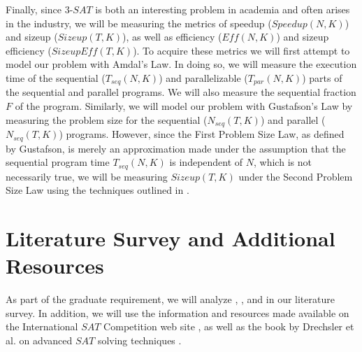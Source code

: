 \documentclass[paper=a4, fontsize=11pt]{scrartcl} %
\begin{document}
Finally, since $3$-$SAT$ is both an interesting problem in academia and often arises in 
the industry, we will be measuring the metrics of speedup ($Speedup(N,K)$) and sizeup ($Sizeup(T,K)$), as 
well as efficiency ($Eff(N,K)$) and sizeup efficiency ($SizeupEff(T,K)$). To acquire these metrics 
we will first attempt to model our problem with Amdal's Law. In doing so, we will
measure the execution time of the sequential ($T_{seq}(N,K)$) and parallelizable ($T_{par}(N,K)$) parts of 
the sequential and parallel programs. We will also measure the sequential fraction $F$ of 
the program. Similarly, we will model our problem with Gustafson's Law by measuring 
the problem size for the sequential ($N_{seq}(T,K)$) and parallel ($N_{seq}(T,K)$)
programs. However, since the First Problem Size Law, as defined by Gustafson, is
merely an approximation made under the assumption that the sequential program time
$T_{seq}(N,K)$ is independent of $N$, which is not necessarily true, we will be measuring $Sizeup(T,K)$ under
the Second Problem Size Law using the techniques outlined in \cite{parallelComputing}.

\section{Literature Survey and Additional Resources}
As part of the graduate requirement, we will analyze \cite{paper1}, \cite{paper2},
and \cite{paper3} in our literature survey. In addition, we will use the information and resources made available
on the International $SAT$ Competition web site \cite{satCompetition}, as well
as the book by Drechsler et al. on advanced $SAT$ solving techniques \cite{satBook}. 

\end{document}
